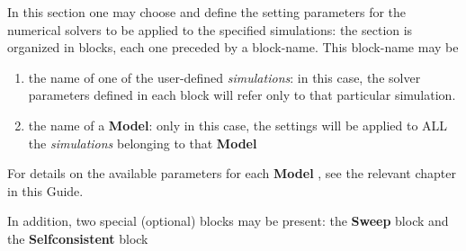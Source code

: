 In this section one may  choose and define the  setting parameters for  the numerical solvers to be applied to the  specified  simulations: the section is organized in blocks, each one preceded by a block-name.
This block-name may be 
\begin{enumerate}
 \item the  name  of one of the  user-defined \textit{simulations}: in this case, the solver parameters defined in each block will refer only to that particular simulation.
\item the  name  of   a \TiberCAD   \textbf{Model}: only in  this  case, the settings  will  be  applied  to  ALL the \textit{simulations} belonging to  that \textbf{Model}
\end{enumerate}
For details on the available  parameters for each \textbf{Model} ,  see  the relevant  chapter in  this  Guide.



 In addition, two special (optional) blocks may be  present: the  \textbf{Sweep} block  and  the  \textbf{Selfconsistent} block



